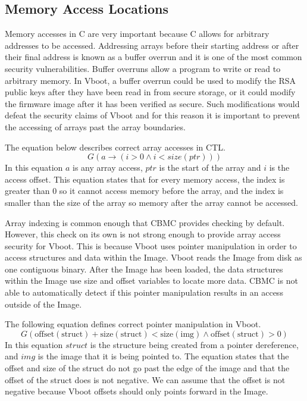 \subsection{Memory Access Locations}\label{my-malloc}

Memory accesses in C are very important because C allows for arbitrary addresses to be accessed. 
Addressing arrays before their starting address or after their final address is known as a buffer overrun and it is one of the most common security vulnerabilities. 
Buffer overruns allow a program to write or read to arbitrary memory. 
In Vboot, a buffer overrun could be used to modify the RSA public keys after they have been read in from secure storage, or it could modify the firmware image after it has been verified as secure. 
Such modifications would defeat the security claims of Vboot and for this reason it is important to prevent the accessing of arrays past the array boundaries.

The equation below describes correct array accesses in CTL. 
\begin{equation}
    G(a \to (i > 0 \land i < size(ptr)))
\end{equation}
In this equation $a$ is any array access, $ptr$ is the start of the array and $i$ is the access offset.
This equation states that for every memory access, the index is greater than 0 so it cannot access memory before the array,  and the index is smaller than the size of the array so memory after the array cannot be accessed.

Array indexing is common enough that CBMC provides checking by default.
However, this check on its own is not strong enough to provide array access security for Vboot. 
This is because Vboot uses pointer manipulation in order to access structures and data within the Image. 
Vboot reads the Image from disk as one contiguous binary. 
After the Image has been loaded, the data structures within the Image use size and offset variables to locate more data.
CBMC is not able to automatically detect if this pointer manipulation results in an access outside of the Image.

The following equation defines correct pointer manipulation in Vboot. 
\begin{equation}
    G(\text{offset}(\text{struct}) + \text{size}(\text{struct}) <
    \text{size}(\text{img}) \land \text{offset}(\text{struct}) > 0)
\end{equation}
In this equation $struct$ is the structure being created from a pointer dereference, and $img$ is the image that it is being pointed to.
The equation states that the offset and size of the struct do not go past the edge of the image and that the offset of the struct does is not negative.
We can assume that the offset is not negative because Vboot offsets should only points forward in the Image.

